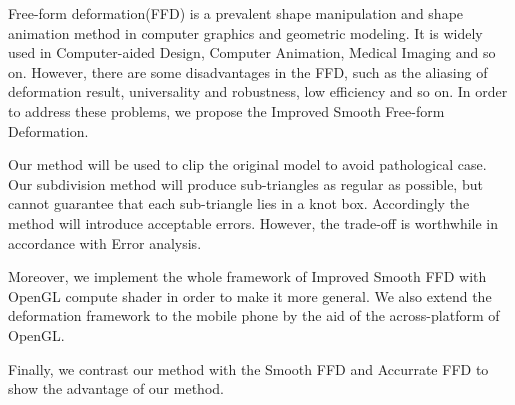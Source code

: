

\begin{eabstract}
    Free-form deformation\cite{Sederberg86}(FFD) is a prevalent shape manipulation and shape animation method in computer graphics and geometric modeling. It is widely used in Computer-aided Design, Computer Animation, Medical Imaging and so on. However, there are some disadvantages in the FFD, such as the aliasing of deformation result, universality and robustness, low efficiency and so on. In order to address these problems, we propose the Improved Smooth Free-form Deformation.

    Our method will be used to clip the original model to avoid pathological case. Our subdivision method will produce sub-triangles as regular as possible, but cannot guarantee that each sub-triangle lies in a knot box. Accordingly the method will introduce acceptable errors. However, the trade-off is worthwhile in accordance with Error analysis. 

    Moreover, we implement the whole framework of Improved Smooth FFD with OpenGL compute shader in order to make it more general. We also extend the deformation framework to the mobile phone by the aid of the across-platform of OpenGL.

    Finally, we contrast our method with the Smooth FFD and Accurrate FFD to show the advantage of our method.
\end{eabstract}

